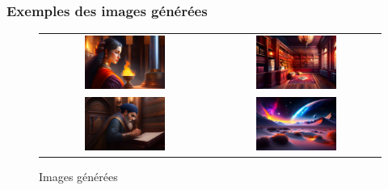 \documentclass[11,5pt]{report}
\begin{document}
\begin{spacing}{2}
\subsubsection{Exemples des images générées}
\vspace{1cm}
\begin{figure}[htbp]
  \centering
  \begin{tabular}{cc}
    \includegraphics[width=0.5\textwidth]{images/image1.jpg} & \includegraphics[width=0.5\textwidth]{images/image3.jpg} \\
    \includegraphics[width=0.5\textwidth]{images/image8.jpg} & \includegraphics[width=0.5\textwidth]{images/image24.jpg} \\
  \end{tabular}
  \caption{Images générées}
  \label{fig:images}
\end{figure}




\end{spacing}
\end{document}
